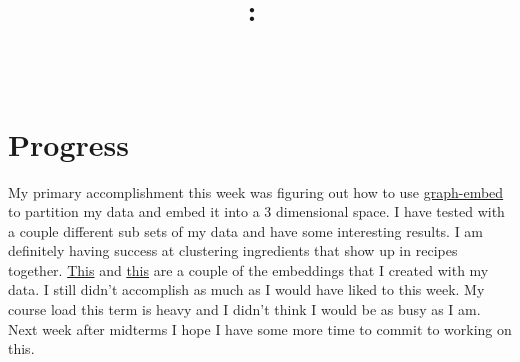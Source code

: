 \documentclass{article}
\title{
    \vspace{2in}
    \textmd{\textbf{\hmwkClass:\ \hmwkTitle}}\\
    \normalsize\vspace{0.1in}\small{\hmwkDueDate}\\
    \vspace{0.1in}\large{\textit{\hmwkClassInstructor}}
    \vspace{3in}
}
\author{\hmwkAuthorName}
\date{}
\begin{document}
\maketitle
\pagebreak

\section{Progress}
My primary accomplishment this week was figuring out how to use \href{https://github.com/LLNL/graph-embed/}
{graph-embed} to partition my data and embed it into a 3 dimensional space. I have tested with a couple
different sub sets of my data and have some interesting results. I am definitely having success at
clustering ingredients that show up in recipes together.
\href{web.cecs.pdx.edu/~ajn6/recipe/plot1}{This} and
\href{web.cecs.pdx.edu/~ajn6/recipe/plot2}{this} are a couple of the embeddings that I created with my data.
I still didn't accomplish as much as I would have liked to this week. My course load this term is heavy and
I didn't think I would be as busy as I am. Next week after midterms I hope I have some more time to commit
to working on this.
\end{document}
